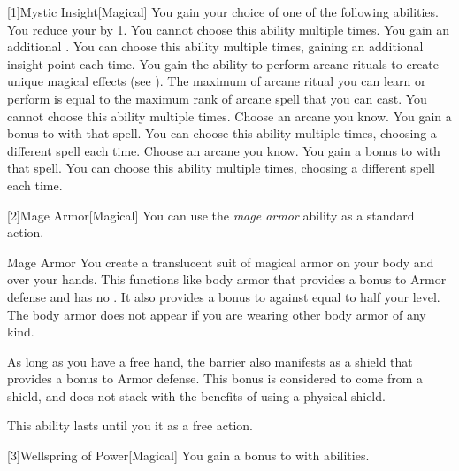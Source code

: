        [1]{Mystic Insight}[Magical]
        You gain your choice of one of the following abilities.
        {
             You reduce your  by 1.
                You cannot choose this ability multiple times.
             You gain an additional .
                You can choose this ability multiple times, gaining an additional insight point each time.
             You gain the ability to perform arcane rituals to create unique magical effects (see ).
                The maximum  of arcane ritual you can learn or perform is equal to the maximum rank of arcane spell that you can cast.
                You cannot choose this ability multiple times.
             Choose an arcane  you know.
                You gain a  bonus to  with that spell.
                You can choose this ability multiple times, choosing a different spell each time.
             Choose an arcane  you know.
                You gain a  bonus to  with that spell.
                You can choose this ability multiple times, choosing a different spell each time.
        }

        [2]{Mage Armor}[Magical] You can use the \textit{mage armor} ability as a standard action.
        \begin{freeability}{Mage Armor}
            You create a translucent suit of magical armor on your body and over your hands.
            This functions like body armor that provides a  bonus to Armor defense and has no .
            It also provides a bonus to  against  equal to half your level.
            The body armor does not appear if you are wearing other body armor of any kind.

            As long as you have a free hand, the barrier also manifests as a shield that provides a  bonus to Armor defense.
            This bonus is considered to come from a shield, and does not stack with the benefits of using a physical shield.

            This ability lasts until you  it as a free action.
        \end{freeability}

        [3]{Wellspring of Power}[Magical]
        You gain a  bonus to  with  abilities.

